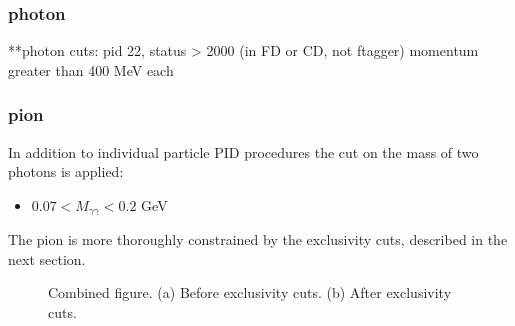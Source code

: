     \subsubsection*{photon}
        **photon cuts:
        pid 22, status > 2000 (in FD or CD, not ftagger)
        momentum greater than 400 MeV each
        
    \subsubsection*{pion}
        In addition to individual particle PID procedures the cut on the mass of two photons is applied:
        \begin{itemize}
        	\item $0.07<M_{\gamma\gamma}<0.2$ GeV
        \end{itemize}
        The pion is more thoroughly constrained by the exclusivity cuts, described in the next section.
        
    
        \begin{figure}[hbt]
            \centering
            \hfill
            \caption[$\gamma \gamma$ Invariant Mass Distribution]{Combined figure. (a) Before exclusivity cuts. (b) After exclusivity cuts.}
            \label{fig:combined_fig}
        \end{figure}
            


